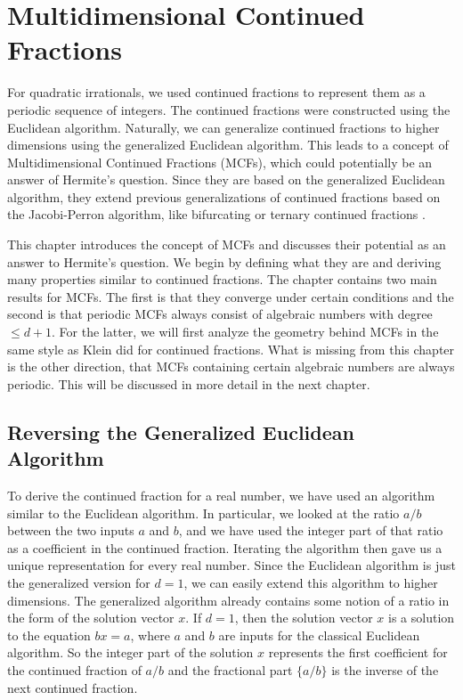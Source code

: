 \chapter{Multidimensional Continued Fractions}
\label{ch:mdcf}

For quadratic irrationals, we used continued fractions to represent them as a
periodic sequence of integers.
The continued fractions were constructed using the Euclidean algorithm.
Naturally, we can generalize continued fractions to higher dimensions using the
generalized Euclidean algorithm.
This leads to a concept of Multidimensional Continued Fractions (MCFs), which could
potentially be an answer of Hermite's question.
Since they are based on the generalized Euclidean algorithm,
they extend previous generalizations of continued fractions based on the
Jacobi-Perron algorithm, like bifurcating or ternary continued fractions \cite{Gupta00}.

This chapter introduces the concept of MCFs and discusses their potential as
an answer to Hermite's question.
We begin by defining what they are and deriving many properties similar to
continued fractions.
The chapter contains two main results for MCFs.
The first is that they converge under certain conditions
and the second is that periodic MCFs always consist of algebraic numbers with degree $≤ d+1$.
For the latter, we will first analyze the geometry behind MCFs in the same
style as Klein did for continued fractions.
What is missing from this chapter is the other direction,
that MCFs containing certain algebraic numbers are always periodic.
This will be discussed in more detail in the next chapter.

\section{Reversing the Generalized Euclidean Algorithm}

To derive the continued fraction for a real number, we have used an algorithm
similar to the Euclidean algorithm.
In particular, we looked at the ratio $a/b$ between the two inputs $a$ and $b$,
and we have used the integer part of that ratio as a coefficient in the
continued fraction.
Iterating the algorithm then gave us a unique representation for
every real number.
Since the Euclidean algorithm is just the generalized version for $d = 1$,
we can easily extend this algorithm to higher dimensions.
The generalized algorithm already contains some notion of a ratio in the form
of the solution vector $x$.
If $d = 1$, then the solution vector $x$ is a solution to the equation $bx = a$,
where $a$ and $b$ are inputs for the classical Euclidean algorithm.
So the integer part of the solution $x$ represents the first coefficient for
the continued fraction of $a/b$ and the fractional part $\{a/b\}$ is the
inverse of the next continued fraction.


